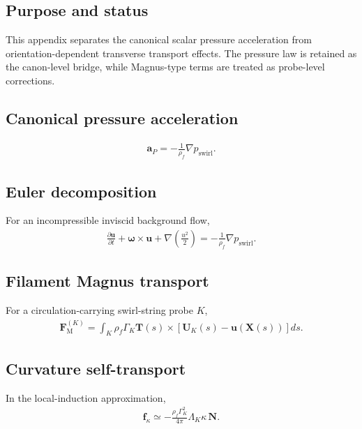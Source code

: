 \subsection{Purpose and status}
    This appendix separates the canonical scalar pressure acceleration from
    orientation-dependent transverse transport effects. The pressure law is retained
    as the canon-level bridge, while Magnus-type terms are treated as probe-level
    corrections.

\subsection{Canonical pressure acceleration}
    \begin{align}
        \mathbf{a}_{P}
        =
        -\frac{1}{\rho_{\!f}}\nabla p_{\mathrm{swirl}}.
    \end{align}

\subsection{Euler decomposition}
    For an incompressible inviscid background flow,
    \begin{align}
        \frac{\partial \mathbf{u}}{\partial t}
        +
        \boldsymbol{\omega}\times\mathbf{u}
        +
        \nabla\left(\frac{u^2}{2}\right)
        =
        -\frac{1}{\rho_{\!f}}\nabla p_{\mathrm{swirl}}.
    \end{align}

\subsection{Filament Magnus transport}
    For a circulation-carrying swirl-string probe $K$,
    \begin{align}
        \mathbf{F}_{\mathrm{M}}^{(K)}
        =
        \int_K
        \rho_{\!f}\Gamma_K
        \mathbf{T}(s)\times
        \left[
            \mathbf{U}_K(s)-\mathbf{u}(\mathbf{X}(s))
        \right]ds.
    \end{align}

\subsection{Curvature self-transport}
    In the local-induction approximation,
    \begin{align}
        \mathbf{f}_{\kappa}
        \simeq
        -\frac{\rho_{\!f}\Gamma_K^2}{4\pi}
        \Lambda_K\kappa\,\mathbf{N}.
    \end{align}

